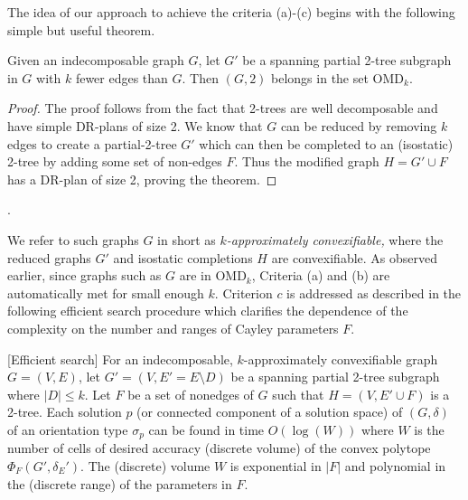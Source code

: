 The idea of our approach to achieve the criteria
(a)-(c) begins with the following simple but useful theorem.

\begin{theorem}
    \label{omdk}
Given an indecomposable graph $G$,
let $G'$ be a spanning partial 2-tree subgraph in $G$ with
$k$ fewer edges than $G$.
Then  $(G,2)$ belongs in the set OMD$_k$.
\end{theorem}

\begin{proof}
The proof follows from the fact that 2-trees are well decomposable and have
simple DR-plans of size 2.
We know that $G$ can be reduced
by removing $k$ edges to create a partial-2-tree $G'$
which can then be completed to an (isostatic) 2-tree by adding some set of non-edges
$F$. Thus the modified graph $H = G'\cup F$ has  a DR-plan of size 2, proving the theorem.
\end{proof}.

We refer to such graphs $G$ in short as {\em $k$-approximately
convexifiable,} where the reduced graphs $G'$ and isostatic completions $H$
are convexifiable.
As observed earlier, since graphs such as $G$ are in OMD$_k$, Criteria (a) and (b)
are automatically met for small enough $k$.
Criterion $c$ is addressed
as described in the following efficient search procedure
which clarifies the dependence of the complexity on the number and ranges  of Cayley
parameters $F$.

\begin{theorem}
    \label{criterionc}
    [Efficient search]
    For an indecomposable, $k$-approximately convexifiable graph $G =
    (V,E)$,
   let $G' = (V,E' =E\setminus D)$ be a spanning partial 2-tree subgraph
    where $|D| \le  k$. Let  $F$ be a set of nonedges of $G$ such that
    $H = (V, E'\cup F)$ is a 2-tree.
    Each solution $p$ (or connected component of a solution space)
    of $(G,\delta)$
    of an orientation type $\sigma_p$ can be found in time $O(\log(W))$ where
    $W$ is the number of cells of desired accuracy (discrete volume) of
    the convex
    polytope $\Phi_F(G',\delta_E')$.  The (discrete) volume $W$ is exponential in
    $|F|$ and polynomial in the (discrete range) of the parameters in $F$.
\end{theorem}

